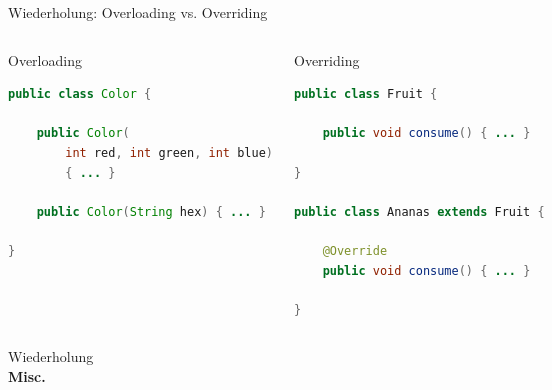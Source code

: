 \documentclass[18pt]{beamer}
\begin{document}
\begin{frame}[fragile]{Wiederholung: Overloading vs. Overriding}
    \begin{columns}[c]
        \begin{exampleblock}{Overloading}
            \begin{lstlisting}[language=Java,basicstyle=\scriptsize]
public class Color {

    public Color(
        int red, int green, int blue)
        { ... }

    public Color(String hex) { ... }

}
            \end{lstlisting}

        \end{exampleblock}


        \begin{exampleblock}{Overriding}
            \begin{lstlisting}[language=Java,basicstyle=\scriptsize]
public class Fruit {

    public void consume() { ... }

}

public class Ananas extends Fruit {

    @Override
    public void consume() { ... }

}
            \end{lstlisting}

        \end{exampleblock}

    \end{columns}
\end{frame}


\begin{frame}{\quad}
    \center
    \Huge{Wiederholung\\ \textbf{Misc.}}
\end{frame}
\end{document}
